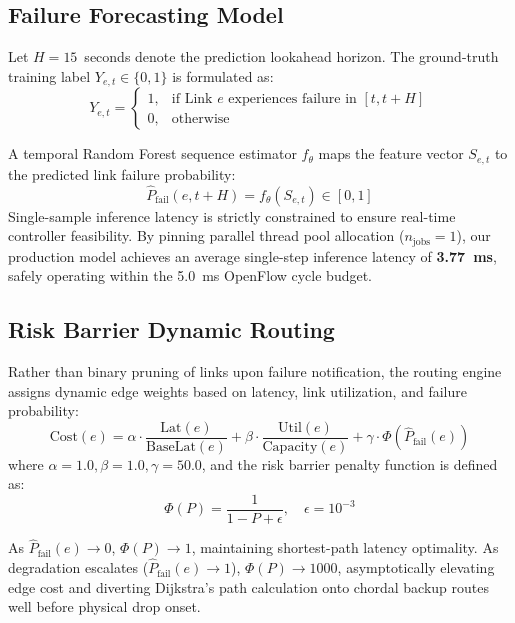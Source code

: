 \documentclass[10pt,twocolumn]{article}
\begin{document}
\subsection{Failure Forecasting Model}
Let $H = 15$~seconds denote the prediction lookahead horizon. The ground-truth training label $Y_{e, t} \in \{0, 1\}$ is formulated as:
\begin{equation}
Y_{e, t} = \begin{cases} 
1, & \text{if Link } e \text{ experiences failure in } [t, t + H] \\
0, & \text{otherwise}
\end{cases}
\label{eq:labeling}
\end{equation}

A temporal Random Forest sequence estimator $f_\theta$ maps the feature vector $S_{e, t}$ to the predicted link failure probability:
\begin{equation}
\hat{P}_{\text{fail}}(e, t + H) = f_\theta(S_{e, t}) \in [0, 1]
\end{equation}
Single-sample inference latency is strictly constrained to ensure real-time controller feasibility. By pinning parallel thread pool allocation ($n_{\text{jobs}} = 1$), our production model achieves an average single-step inference latency of \textbf{3.77~ms}, safely operating within the 5.0~ms OpenFlow cycle budget.

\subsection{Risk Barrier Dynamic Routing}
Rather than binary pruning of links upon failure notification, the routing engine assigns dynamic edge weights based on latency, link utilization, and failure probability:
\begin{equation}
\text{Cost}(e) = \alpha \cdot \frac{\text{Lat}(e)}{\text{BaseLat}(e)} + \beta \cdot \frac{\text{Util}(e)}{\text{Capacity}(e)} + \gamma \cdot \Phi(\hat{P}_{\text{fail}}(e))
\label{eq:cost_function}
\end{equation}
where $\alpha=1.0, \beta=1.0, \gamma=50.0$, and the risk barrier penalty function is defined as:
\begin{equation}
\Phi(P) = \frac{1}{1 - P + \epsilon}, \quad \epsilon = 10^{-3}
\label{eq:barrier}
\end{equation}

As $\hat{P}_{\text{fail}}(e) \to 0$, $\Phi(P) \to 1$, maintaining shortest-path latency optimality. As degradation escalates ($\hat{P}_{\text{fail}}(e) \to 1$), $\Phi(P) \to 1000$, asymptotically elevating edge cost and diverting Dijkstra's path calculation onto chordal backup routes well before physical drop onset.
\end{document}
